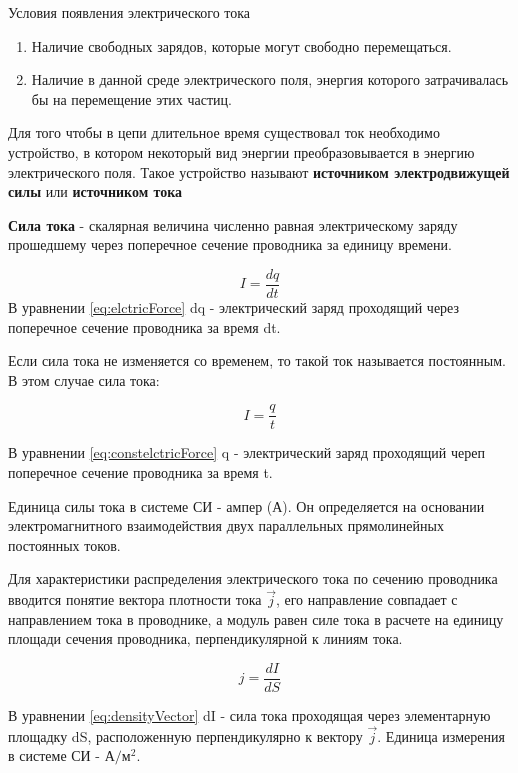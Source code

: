 \documentclass[14pt, a4paper, twoside]{extreport}
\begin{document}
Условия появления электрического тока
\begin{enumerate}
  \item Наличие свободных зарядов, которые могут свободно перемещаться.
  \item Наличие в данной среде электрического поля, энергия которого затрачивалась бы на перемещение этих частиц.
\end{enumerate}

Для того чтобы в цепи длительное время существовал ток необходимо устройство, в котором некоторый вид энергии преобразовывается в энергию электрического поля. Такое устройство называют \textbf{источником электродвижущей силы} или \textbf{источником тока}

\textbf{Сила тока} - скалярная величина численно равная электрическому заряду прошедшему через поперечное сечение проводника за единицу времени.

\begin{equation}
  \label{eq:elctricForce}
  I = \frac{dq}{dt}
\end{equation}
В уравнении \ref{eq:elctricForce} dq - электрический заряд проходящий через поперечное сечение проводника за время dt.

Если сила тока не изменяется со временем, то такой ток называется постоянным. В этом случае сила тока:

\begin{equation}
  \label{eq:constelctricForce}
  I = \frac{q}{t}
\end{equation}

В уравнении \ref{eq:constelctricForce} q - электрический заряд проходящий череп поперечное сечение проводника за время t.

Единица силы тока в системе СИ - ампер (А). Он определяется на основании электромагнитного взаимодействия двух параллельных прямолинейных постоянных токов.

Для характеристики распределения электрического тока по сечению проводника вводится понятие вектора плотности тока $\vec{j}$, его направление совпадает с направлением тока в проводнике, а модуль равен силе тока в расчете на единицу площади сечения проводника, перпендикулярной к линиям тока.

\begin{equation}
  \label{eq:densityVector}
  j=\frac{dI}{dS}
\end{equation}

В уравнении \ref{eq:densityVector} dI - сила тока проходящая через элементарную площадку dS, расположенную перпендикулярно к вектору $\vec{j}$. Единица измерения в системе СИ - $\text{А}/\text{м}^2$.
\end{document}
